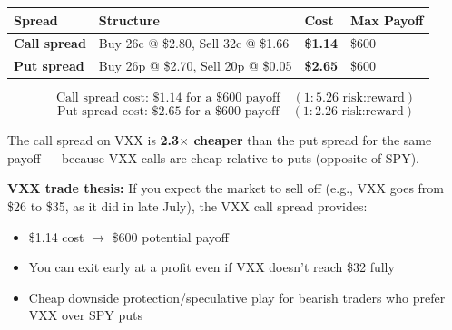 \documentclass[12pt,openany]{book}
\begin{document}
\begin{center}
\end{center}


\begin{center}
\scriptsize
\setlength{\tabcolsep}{3pt}
\begin{tabular}{|L{3.0cm}|L{3.0cm}|L{3.0cm}|L{3.0cm}|}
\hline
\textbf{Spread} & \textbf{Structure} & \textbf{Cost} & \textbf{Max Payoff} \\
\hline
\textbf{Call spread} & Buy 26c @ \$2.80, Sell 32c @ \$1.66 & \textbf{\$1.14} & \$600 \\
\hline
\textbf{Put spread} & Buy 26p @ \$2.70, Sell 20p @ \$0.05 & \textbf{\$2.65} & \$600 \\
\hline
\end{tabular}
\end{center}

\[
\text{Call spread cost: \$1.14 for a \$600 payoff} \quad (1:5.26 \text{ risk:reward})
\]
\[
\text{Put spread cost: \$2.65 for a \$600 payoff} \quad (1:2.26 \text{ risk:reward})
\]

The call spread on VXX is \textbf{2.3\(\times\) cheaper} than the put spread for the same payoff — because VXX calls are cheap relative to puts (opposite of SPY).

\textbf{VXX trade thesis:} If you expect the market to sell off (e.g., VXX goes from \$26 to \$35, as it did in late July), the VXX call spread provides:
\begin{itemize}[leftmargin=*]
    \item \$1.14 cost \(\rightarrow\) \$600 potential payoff
    \item You can exit early at a profit even if VXX doesn't reach \$32 fully
    \item Cheap downside protection/speculative play for bearish traders who prefer VXX over SPY puts
\end{itemize}
\end{document}
